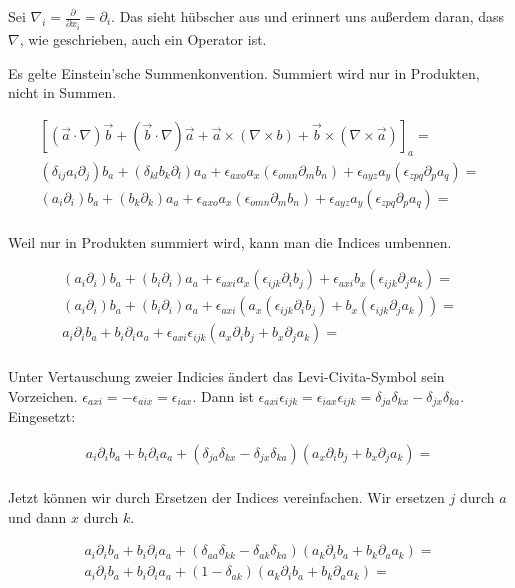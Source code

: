 \documentclass[a4paper,german,12pt,smallheadings]{scrartcl}
\begin{document}
Sei $\nabla_i = \frac{\partial}{\partial x_i} = \partial_i$. Das sieht hübscher
aus und erinnert uns außerdem daran, dass $\nabla$, wie geschrieben, auch ein
Operator ist.

Es gelte Einstein'sche Summenkonvention. Summiert wird nur in Produkten, nicht in Summen.

\begin{align*}
  \left[(\vec{a}\cdot\nabla)\vec{b} + (\vec{b}\cdot\nabla)\vec{a} + \vec{a} \times (\nabla \times b) + \vec{b} \times (\nabla \times \vec{a})\right]_a = \\
  (\delta_{ij}a_i\partial_j)b_a + (\delta_{kl}b_k\partial_l)a_a + \epsilon_{axo}a_x(\epsilon_{omn}\partial_mb_n) + \epsilon_{ayz} a_y (\epsilon_{zpq} \partial_p a_q) =\\
  (a_i\partial_i)b_a + (b_k\partial_k)a_a + \epsilon_{axo}a_x(\epsilon_{omn}\partial_mb_n) + \epsilon_{ayz} a_y (\epsilon_{zpq} \partial_p a_q) =\\
\end{align*}

Weil nur in Produkten summiert wird, kann man die Indices umbennen.

\begin{align*}
  (a_i\partial_i)b_a + (b_i\partial_i)a_a + \epsilon_{axi}a_x(\epsilon_{ijk}\partial_ib_j) + \epsilon_{axi} b_x (\epsilon_{ijk} \partial_j a_k) =\\
  (a_i\partial_i)b_a + (b_i\partial_i)a_a + \epsilon_{axi}(a_x(\epsilon_{ijk}\partial_ib_j) + b_x (\epsilon_{ijk} \partial_j a_k)) =\\
  a_i\partial_ib_a + b_i\partial_ia_a + \epsilon_{axi}\epsilon_{ijk}(a_x\partial_ib_j + b_x\partial_ja_k) =\\
\end{align*}

Unter Vertauschung zweier Indicies ändert das Levi-Civita-Symbol sein
Vorzeichen. $\epsilon_{axi} = -\epsilon_{aix} = \epsilon_{iax}$. Dann ist
$\epsilon_{axi}\epsilon_{ijk} = \epsilon_{iax}\epsilon_{ijk} =
\delta_{ja}\delta_{kx} - \delta_{jx}\delta_{ka}$. Eingesetzt:

\begin{align*}
  a_i\partial_ib_a + b_i\partial_ia_a + (\delta_{ja}\delta_{kx} - \delta_{jx}\delta_{ka})(a_x\partial_ib_j + b_x\partial_ja_k) =\\
\end{align*}

Jetzt können wir durch Ersetzen der Indices vereinfachen. Wir ersetzen $j$ durch $a$ und dann $x$ durch $k$.

\begin{align*}
  a_i\partial_ib_a + b_i\partial_ia_a + (\delta_{aa}\delta_{kk} - \delta_{ak}\delta_{ka})(a_k\partial_ib_a + b_k\partial_aa_k) =\\
  a_i\partial_ib_a + b_i\partial_ia_a + (1 - \delta_{ak})(a_k\partial_ib_a + b_k\partial_aa_k) =\\
\end{align*}
\end{document}
